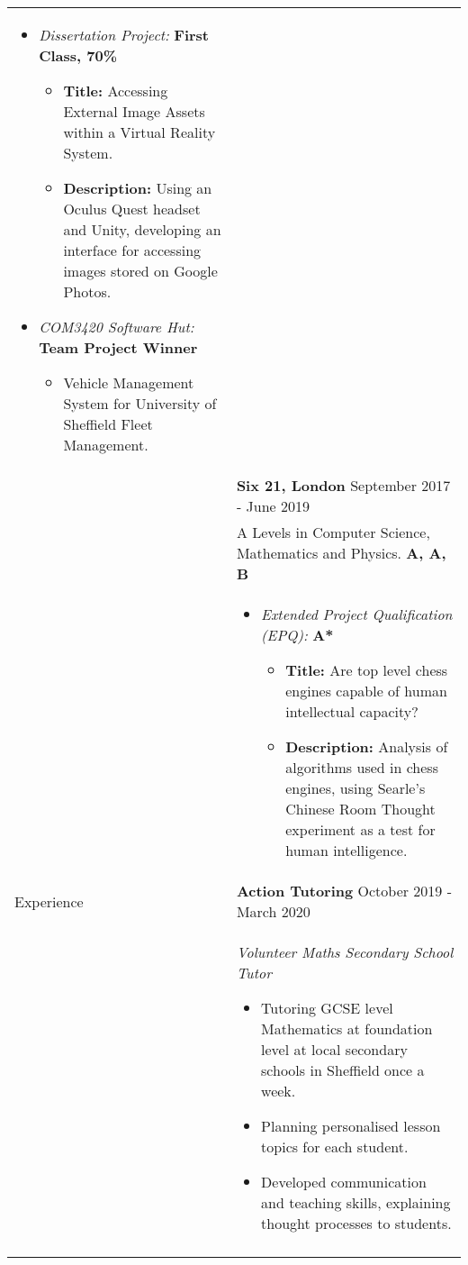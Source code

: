 \documentclass[11pt]{article}
\begin{document}
\begin{minipage}[t][0pt]{\linewidth}
\begin{tabular}[t]{p{2cm} p{14cm}}
	    \begin{itemize}
    		\renewcommand{\labelitemi}{$\diamond$}
        	    \item \textit{Dissertation Project:} \hfill \textbf{First Class, 70\%} 
        	    \begin{itemize}
    				\renewcommand{\labelitemii}{$\cdot$}
        			\item \textbf{Title:} Accessing External Image Assets within a Virtual Reality System.
        			\item \textbf{Description:} Using an Oculus Quest headset and Unity, developing an interface for accessing images stored on Google Photos.
			    \end{itemize}
	        	\item \textit{COM3420 Software Hut:} \hfill \textbf{Team Project Winner} 
        	    \begin{itemize}
    				\renewcommand{\labelitemii}{$\cdot$}
        			\item Vehicle Management System for University of Sheffield Fleet Management.
		        \end{itemize}
		\end{itemize} \\ &
		
		\textbf{Six 21, London} \hfill September 2017 - June 2019 \\ &
		A Levels in Computer Science, Mathematics and Physics. \hfill \textbf{A, A, B} \\ &
		
	    \begin{itemize}
    		\renewcommand{\labelitemi}{$\diamond$}
        	    \item \textit{Extended Project Qualification (EPQ):} \hfill \textbf{A*} 
        	    \begin{itemize}
    				\renewcommand{\labelitemii}{$\cdot$}
        			\item \textbf{Title:} Are top level chess engines capable of human intellectual capacity?
        			\item \textbf{Description:} Analysis of algorithms used in chess engines, using Searle's Chinese Room Thought experiment as a test for human intelligence.
			    \end{itemize}
		\end{itemize} \\
	{Experience} &
		\textbf{Action Tutoring}  \hfill October 2019 - March 2020 \\ &
		\textit{Volunteer Maths Secondary School Tutor}
		\begin{itemize}
			\renewcommand{\labelitemi}{$\diamond$}
			\item Tutoring GCSE level Mathematics at foundation level at local secondary schools in Sheffield once a week. 
			\item Planning personalised lesson topics for each student.
			\item Developed communication and teaching skills, explaining thought processes to students. 
		\end{itemize} \\ &
		

\end{tabular}
\end{minipage}
\end{document}

